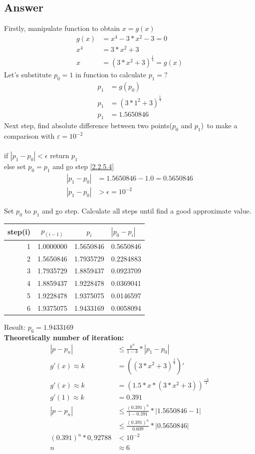 \documentclass{article}
\begin{document}
\subsection{Answer}
Firstly, manipulate function to obtain $x=g(x)$
\begin{align}
\label{2.2.5.1}
g(x) & = x^4-3*x^2-3 = 0\\
\label{2.2.5.2}
x^4 & = 3*x^2+3\\
\label{2.2.5.3}
x & = (3*x^2+3)^ \frac{1}{4}=g(x)
\end{align}
Let's substitute $p_0=1$ in function to calculate $p_1=?$\\
\begin{align}
\label{2.2.5.4}	p_1 & = g(p_0)\\
\label{2.2.5.5}	p_1 & = (3*1^2+3)^ \frac{1}{4}\\
\label{2.2.5.6} p_1 & = 1.5650846
\end{align}
Next step, find absolute difference between two points($p_0$ and $p_1$)\ to make a comparison with $\varepsilon = 10^{-2}$\\\\
if $|p_1-p_0|< \epsilon$ return $p_1$\\
else set $p_0=p_1$ and go step \ref{2.2.5.4}
\begin{align}
\label{2.2.5.7} |p_1-p_0| & = 1.5650846 - 1.0 = 0.5650846 \\
\label{2.2.5.8} |p_1-p_0| & > \epsilon=10^{-2}
\end{align}

Set $p_0$ to $p_1$ and go step. Calculate all steps until find a good approximate value.\\

\begin{tabular}{r|cc|l}
step(i) & $p_(i-1)$ & $p_i$ & $|p_0-p_i|$\\
\hline
1 & 1.0000000 & 1.5650846 & 0.5650846\\
2 & 1.5650846 & 1.7935729 & 0.2284883\\
3 & 1.7935729 & 1.8859437 & 0.0923709\\
4 & 1.8859437 & 1.9228478 & 0.0369041\\
5 & 1.9228478 & 1.9375075 & 0.0146597\\
6 & 1.9375075 & 1.9433169 & 0.0058094\\
\end{tabular}
Result: $p_6= 1.9433169$\\

\textbf{Theoretically number of iteration:}
\begin{align}
\label{k}|p-p_n| & \leq\frac{k^n}{1-k}*|p_1-p_0|\\
\label{}g'(x) \approx k & = ((3*x^2+3)^ \frac{1}{4})'\\
\label{}g'(x) \approx k & = (1.5*x*(3*x^2+3))^ \frac{-3}{4}\\
\label{}g'(1) \approx k & = 0.391\\
\label{}|p-p_n| & \leq\frac{(0.391)^n}{1-0.391}*|1.5650846-1|\\
\label{}& \leq\frac{(0.391)^n}{0.609}*|0.5650846|\\
\label{} (0.391)^n*0,92788 & < 10^{-2} \\
\label{} n& \approx 6
\end{align}
\end{document}
